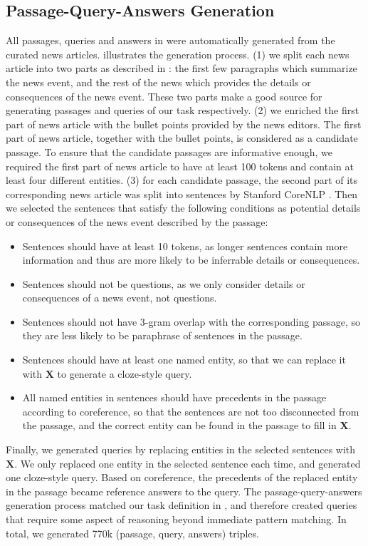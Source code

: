 \subsection{Passage-Query-Answers Generation}
All passages, queries and answers in \ReCoRD were automatically generated from the curated news articles.
 illustrates the generation process. (1) we split each news article into two parts as described in :
the first few paragraphs which summarize the news event,
and the rest of the news which provides the details or consequences of the news event.
These two parts make a good source for generating passages and queries of our task respectively.
(2) we enriched the first part of news article with the bullet points provided by the news editors.
The first part of news article, together with the bullet points, is considered as a candidate passage.
To ensure that the candidate passages are informative enough, we required the first part of news article to have at least 100 tokens and contain at least four different entities.
(3) for each candidate passage, the second part of its corresponding news article was split into sentences by Stanford CoreNLP \cite{corenlp}.
Then we selected the sentences that satisfy the following conditions as potential details or consequences of the news event described by the passage: 
\begin{itemize}[itemsep=0pt,topsep=6pt,leftmargin=10pt]
    \item Sentences should have at least 10 tokens, as longer sentences contain more information and thus are more likely to be inferrable details or consequences.
    \item Sentences should not be questions, as we only consider details or consequences of a news event, not questions.
    \item Sentences should not have 3-gram overlap with the corresponding passage, so they are less likely to be paraphrase of sentences in the passage.
    \item Sentences should have at least one named entity, so that we can replace it with $\mathbf{X}$ to generate a cloze-style query.
    \item All named entities in sentences should have precedents in the passage according to coreference, so that the sentences are not too disconnected from the passage, and the correct entity can be found in the passage to fill in $\mathbf{X}$. 
\end{itemize}
Finally, we generated queries by replacing entities in the selected sentences with $\mathbf{X}$.  
We only replaced one entity in the selected sentence each time, and generated one cloze-style query.
Based on coreference, the precedents of the replaced entity in the passage became reference answers to the query. 
The passage-query-answers generation process matched our task definition in , and therefore created queries that require some aspect of reasoning beyond immediate pattern matching.
In total, we generated 770k (passage, query, answers) triples.

